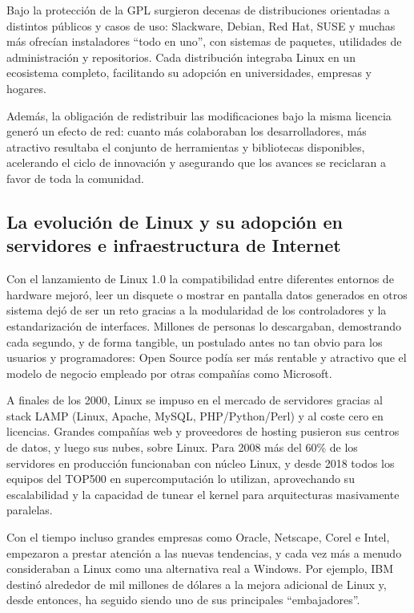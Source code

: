 \documentclass[a4paper,12pt]{article}
\begin{document}
Bajo la protección de la GPL surgieron decenas de distribuciones orientadas a
distintos públicos y casos de uso: Slackware, Debian, Red Hat, SUSE y muchas más
ofrecían instaladores “todo en uno”, con sistemas de paquetes, utilidades de
administración y repositorios. Cada distribución integraba Linux en un
ecosistema completo, facilitando su adopción en universidades, empresas y
hogares.

Además, la obligación de redistribuir las modificaciones bajo la misma licencia 
generó un efecto de red: cuanto más colaboraban los desarrolladores, más
atractivo resultaba el conjunto de herramientas y bibliotecas disponibles,
acelerando el ciclo de innovación y asegurando que los avances se reciclaran a
favor de toda la comunidad.


\subsection{La evolución de Linux y su adopción en servidores e infraestructura de Internet}

Con el lanzamiento de Linux 1.0 la compatibilidad entre diferentes entornos de
hardware mejoró, leer un disquete o mostrar en pantalla datos generados en otros
sistema dejó de ser un reto gracias a la modularidad de los controladores y la
estandarización de interfaces. Millones de personas lo descargaban, demostrando
cada segundo, y de forma tangible, un postulado antes no tan obvio para los 
usuarios y programadores: Open Source podía ser más rentable y atractivo que el
modelo de negocio empleado por otras compañías como Microsoft.

A finales de los 2000, Linux se impuso en el mercado de servidores gracias al
stack LAMP (Linux, Apache, MySQL, PHP/Python/Perl) y al coste cero en licencias.
Grandes compañías web y proveedores de hosting pusieron sus centros de datos, y
luego sus nubes, sobre Linux. Para 2008 más del 60\% de los servidores en
producción funcionaban con núcleo Linux, y desde 2018 todos los equipos del
TOP500 en supercomputación lo utilizan, aprovechando su escalabilidad y la 
capacidad de tunear el kernel para arquitecturas masivamente paralelas.

Con el tiempo incluso grandes empresas como Oracle, Netscape, Corel e Intel,
empezaron a prestar atención a las nuevas tendencias, y cada vez más a menudo
consideraban a Linux como una alternativa real a Windows. Por ejemplo, IBM
destinó alrededor de mil millones de dólares a la mejora adicional de Linux y,
desde entonces, ha seguido siendo uno de sus principales “embajadores”.
\end{document}
